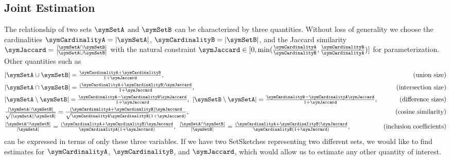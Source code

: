 \documentclass[sigconf, nonacm]{acmart}
\begin{document}
\subsection{Joint Estimation}
\label{sec:joint_estimation}
The relationship of two sets $\symSetA$ and $\symSetB$ can be characterized by three quantities. Without loss of generality we choose 
the cardinalities $\symCardinalityA = |\symSetA|$, $\symCardinalityB = |\symSetB|$, and the Jaccard similarity $\symJaccard = \frac{|\symSetA\cap\symSetB|}{|\symSetA\cup\symSetB|}$ with the natural constraint $\symJaccard\in[0,\min({\textstyle\frac{\symCardinalityA}{\symCardinalityB},\frac{\symCardinalityB}{\symCardinalityA}})]$ for parameterization.
Other quantities such as
\begin{align*}
&|\symSetA\cup\symSetB| = {\textstyle\frac{\symCardinalityA+\symCardinalityB}{1+\symJaccard}}, &(\textnormal{union size})\\
&|\symSetA\cap\symSetB| = {\textstyle\frac{(\symCardinalityA+\symCardinalityB)\symJaccard}{1+\symJaccard}}, &(\textnormal{intersection size})\\
&|\symSetA\setminus\symSetB| = {\textstyle\frac{\symCardinalityA - \symCardinalityB\symJaccard}{1+\symJaccard}},\ |\symSetB\setminus\symSetA| = {\textstyle\frac{\symCardinalityB - \symCardinalityA\symJaccard}{1+\symJaccard}},  &(\textnormal{difference sizes})\\
&\textstyle{\frac{|\symSetA\cap\symSetB|}{\sqrt{|\symSetA||\symSetB|}}} = \textstyle{\frac{(\symCardinalityA+\symCardinalityB)\symJaccard}{\sqrt{\symCardinalityA\symCardinalityB}(1+\symJaccard)}}, &(\textnormal{cosine similarity})\\
&\textstyle{\frac{|\symSetA\cap\symSetB|}{|\symSetA|}} = {\textstyle\frac{(\symCardinalityA+\symCardinalityB)\symJaccard}{\symCardinalityA(1+\symJaccard)}},\ \textstyle{\frac{|\symSetA\cap\symSetB|}{|\symSetB|}} = {\textstyle\frac{(\symCardinalityA+\symCardinalityB)\symJaccard}{\symCardinalityB(1+\symJaccard)}}, &(\textnormal{inclusion coefficients})\\
\end{align*}
can be expressed in terms of only these three variables. If we have two SetSketches representing two different sets, we would like to find estimates for $\symCardinalityA$, $\symCardinalityB$, and $\symJaccard$, which would allow us to estimate any other quantity of interest.
\end{document}
